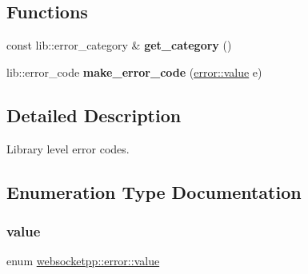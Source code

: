 \subsection*{Functions}
\begin{DoxyCompactItemize}
\item 
\mbox{\label{namespacewebsocketpp_1_1error_aff1f9bd9984308ee5631761b89cf706f}} 
const lib\+::error\+\_\+category \& {\bfseries get\+\_\+category} ()
\item 
\mbox{\label{namespacewebsocketpp_1_1error_a3344622df8c36e8ae03c59164e7b5e89}} 
lib\+::error\+\_\+code {\bfseries make\+\_\+error\+\_\+code} (\mbox{\hyperlink{namespacewebsocketpp_1_1error_a0558d884e44e79146ad4947aea63f68d}{error\+::value}} e)
\end{DoxyCompactItemize}


\subsection{Detailed Description}
Library level error codes. 

\subsection{Enumeration Type Documentation}
\mbox{\label{namespacewebsocketpp_1_1error_a0558d884e44e79146ad4947aea63f68d}} 
\subsubsection{\texorpdfstring{value}{value}}
{\footnotesize\ttfamily enum \mbox{\hyperlink{namespacewebsocketpp_1_1error_a0558d884e44e79146ad4947aea63f68d}{websocketpp\+::error\+::value}}}

